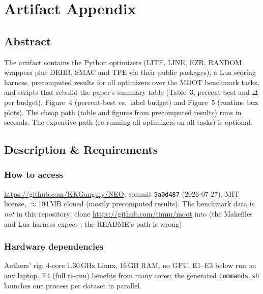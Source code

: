 
\appendix
\section{Artifact Appendix}

\subsection{Abstract}
The artifact contains the Python optimizers (LITE, LINE, EZR, RANDOM
wrappers plus DEHB, SMAC and TPE via their public packages), a Lua
scoring harness, precomputed results for all optimizers over the MOOT
benchmark tasks, and scripts that rebuild the paper's summary table
(Table~3, percent-best and $\Delta$ per budget), Figure~4 (percent-best
vs.\ label budget) and Figure~5 (runtime box plots). The cheap path
(table and figures from precomputed results) runs in seconds. The
expensive path (re-running all optimizers on all tasks) is optional.

\subsection{Description \& Requirements}

\subsubsection{How to access}
\url{https://github.com/KKGanguly/NEO}, commit \texttt{5a0d487}
(2026-07-27), MIT license, $\approx$104\,MB cloned (mostly precomputed
results). The benchmark data is \emph{not} in this repository: clone
\url{https://github.com/timm/moot} into  (the
Makefiles and Lua harness expect ;
the README's  path is wrong).

\subsubsection{Hardware dependencies}
Authors' rig: 4-core 1.30\,GHz Linux, 16\,GB RAM, no GPU. E1--E3 below
run on any laptop. E4 (full re-run) benefits from many cores; the
generated \texttt{commands.sh} launches one process per dataset in
parallel.

